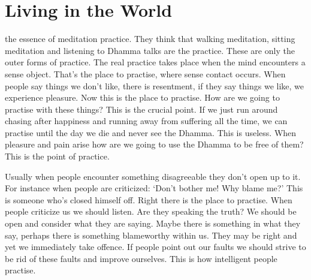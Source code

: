 
\renewcommand{\chapterFootnotemark}{\footnotemark}
\renewcommand{\chapterFootnotetext}{\footnotetext{\textit{Note}: This talk has been published elsewhere under the title: `\textit{Living in the World with Dhamma}'}}

\chapter{Living in the World}

 the essence of meditation practice. They think that walking meditation, sitting meditation and listening to Dhamma talks are the practice. These are only the outer forms of practice. The real practice takes place when the mind encounters a sense object. That's the place to practise, where sense contact occurs. When people say things we don't like, there is resentment, if they say things we like, we experience pleasure. Now this is the place to practise. How are we going to practise with these things? This is the crucial point. If we just run around chasing after happiness and running away from suffering all the time, we can practise until the day we die and never see the Dhamma. This is useless. When pleasure and pain arise how are we going to use the Dhamma to be free of them? This is the point of practice.

Usually when people encounter something disagreeable they don't open up to it. For instance when people are criticized: `Don't bother me! Why blame me?' This is someone who's closed himself off. Right there is the place to practise. When people criticize us we should listen. Are they speaking the truth? We should be open and consider what they are saying. Maybe there is something in what they say, perhaps there is something blameworthy within us. They may be right and yet we immediately take offence. If people point out our faults we should strive to be rid of these faults and improve ourselves. This is how intelligent people practise.

